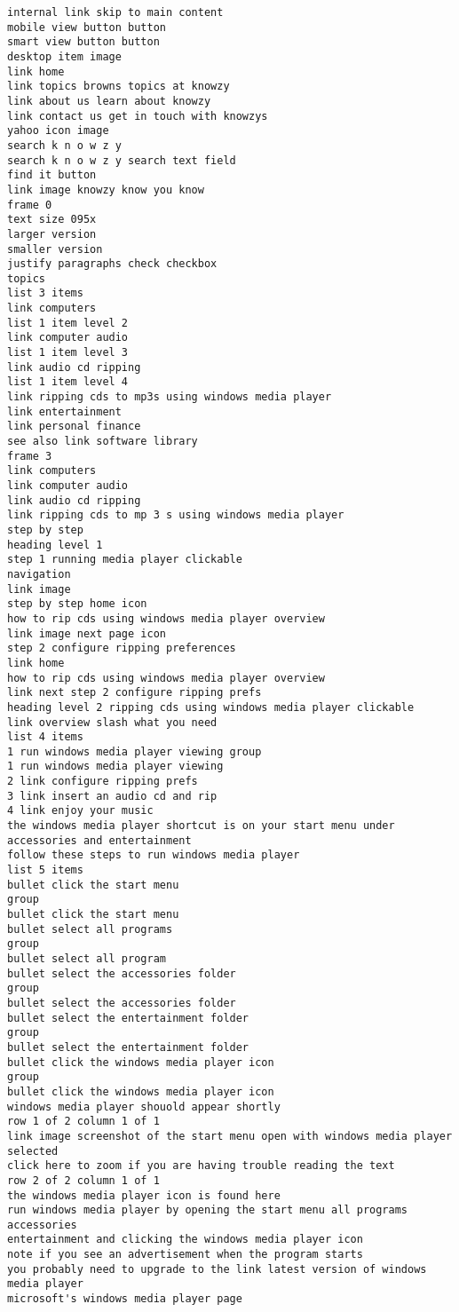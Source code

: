 \begin{verbatim}
internal link skip to main content
mobile view button button
smart view button button
desktop item image
link home
link topics browns topics at knowzy
link about us learn about knowzy
link contact us get in touch with knowzys
yahoo icon image
search k n o w z y
search k n o w z y search text field
find it button
link image knowzy know you know
frame 0
text size 095x
larger version
smaller version
justify paragraphs check checkbox
topics
list 3 items
link computers
list 1 item level 2
link computer audio
list 1 item level 3
link audio cd ripping
list 1 item level 4
link ripping cds to mp3s using windows media player
link entertainment
link personal finance
see also link software library
frame 3
link computers
link computer audio
link audio cd ripping
link ripping cds to mp 3 s using windows media player
step by step
heading level 1
step 1 running media player clickable
navigation
link image
step by step home icon
how to rip cds using windows media player overview
link image next page icon
step 2 configure ripping preferences
link home
how to rip cds using windows media player overview
link next step 2 configure ripping prefs
heading level 2 ripping cds using windows media player clickable
link overview slash what you need
list 4 items
1 run windows media player viewing group
1 run windows media player viewing
2 link configure ripping prefs
3 link insert an audio cd and rip
4 link enjoy your music
the windows media player shortcut is on your start menu under accessories and entertainment
follow these steps to run windows media player
list 5 items
bullet click the start menu
group
bullet click the start menu
bullet select all programs
group
bullet select all program
bullet select the accessories folder
group
bullet select the accessories folder
bullet select the entertainment folder
group
bullet select the entertainment folder
bullet click the windows media player icon
group
bullet click the windows media player icon
windows media player shouold appear shortly
row 1 of 2 column 1 of 1
link image screenshot of the start menu open with windows media player selected
click here to zoom if you are having trouble reading the text
row 2 of 2 column 1 of 1
the windows media player icon is found here
run windows media player by opening the start menu all programs accessories
entertainment and clicking the windows media player icon
note if you see an advertisement when the program starts
you probably need to upgrade to the link latest version of windows media player
microsoft's windows media player page
\end{verbatim}
